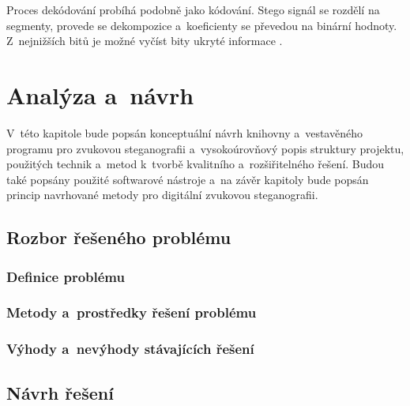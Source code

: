 Proces dekódování probíhá podobně jako kódování. Stego signál se rozdělí na
segmenty, provede se dekompozice a~koeficienty se převedou na binární hodnoty.
Z~nejnižších bitů je možné vyčíst bity ukryté informace \cite{Pooyan2007}.


\chapter{Analýza a~návrh}
\label{cha:library-design}

V~této kapitole bude popsán konceptuální návrh knihovny a~vestavěného programu
pro zvukovou steganografii a~vysokoúrovňový popis struktury projektu, použitých
technik a~metod k~tvorbě kvalitního a~rozšiřitelného řešení. Budou také popsány
použité softwarové nástroje a~na závěr kapitoly bude popsán princip navrhované
metody pro digitální zvukovou steganografii.

\section{Rozbor řešeného problému}
\label{sec:problem-analysis}


\blindtext

\subsection*{Definice problému}
\label{sub:problem-definition}


\blindtext

\subsection*{Metody a~prostředky řešení problému}
\label{sub:problem-solution}


\blindtext

\subsection*{Výhody a~nevýhody stávajících řešení}
\label{sub:pros-cons-existing-solutions}


\blindtext

\section{Návrh řešení}
\label{sec:solution-proposal}

